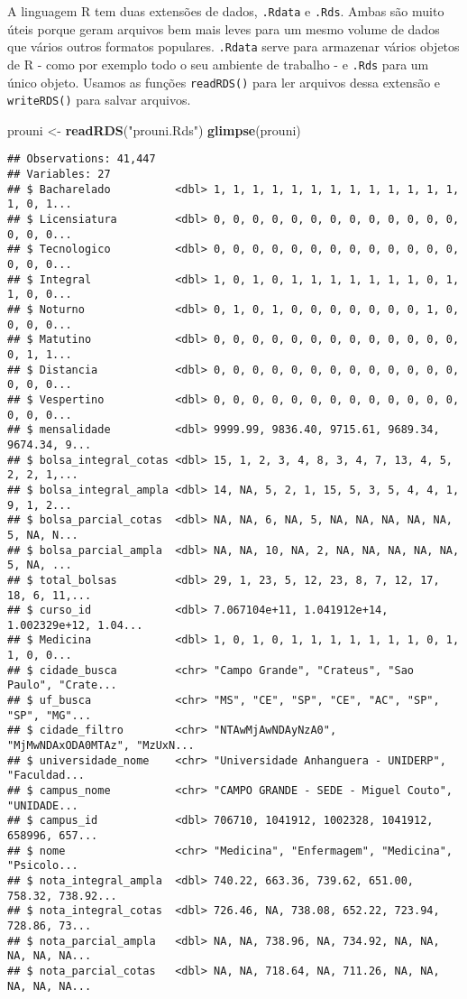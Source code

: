 \documentclass[
]{article}
\newenvironment{Shaded}{\begin{snugshade}}{\end{snugshade}}
\newcommand{\KeywordTok}[1]{\textcolor[rgb]{0.13,0.29,0.53}{\textbf{#1}}}
\newcommand{\NormalTok}[1]{#1}
\newcommand{\StringTok}[1]{\textcolor[rgb]{0.31,0.60,0.02}{#1}}
\begin{document}
A linguagem R tem duas extensões de dados, \texttt{.Rdata} e
\texttt{.Rds}. Ambas são muito úteis porque geram arquivos bem mais
leves para um mesmo volume de dados que vários outros formatos
populares. \texttt{.Rdata} serve para armazenar vários objetos de R -
como por exemplo todo o seu ambiente de trabalho - e \texttt{.Rds} para
um único objeto. Usamos as funções \texttt{readRDS()} para ler arquivos
dessa extensão e \texttt{writeRDS()} para salvar arquivos.

\begin{Shaded}
\begin{Highlighting}[]
\NormalTok{prouni <-}\StringTok{ }\KeywordTok{readRDS}\NormalTok{(}\StringTok{"prouni.Rds"}\NormalTok{)}
\KeywordTok{glimpse}\NormalTok{(prouni)}
\end{Highlighting}
\end{Shaded}

\begin{verbatim}
## Observations: 41,447
## Variables: 27
## $ Bacharelado          <dbl> 1, 1, 1, 1, 1, 1, 1, 1, 1, 1, 1, 1, 1, 1, 0, 1...
## $ Licensiatura         <dbl> 0, 0, 0, 0, 0, 0, 0, 0, 0, 0, 0, 0, 0, 0, 0, 0...
## $ Tecnologico          <dbl> 0, 0, 0, 0, 0, 0, 0, 0, 0, 0, 0, 0, 0, 0, 0, 0...
## $ Integral             <dbl> 1, 0, 1, 0, 1, 1, 1, 1, 1, 1, 1, 0, 1, 1, 0, 0...
## $ Noturno              <dbl> 0, 1, 0, 1, 0, 0, 0, 0, 0, 0, 0, 1, 0, 0, 0, 0...
## $ Matutino             <dbl> 0, 0, 0, 0, 0, 0, 0, 0, 0, 0, 0, 0, 0, 0, 1, 1...
## $ Distancia            <dbl> 0, 0, 0, 0, 0, 0, 0, 0, 0, 0, 0, 0, 0, 0, 0, 0...
## $ Vespertino           <dbl> 0, 0, 0, 0, 0, 0, 0, 0, 0, 0, 0, 0, 0, 0, 0, 0...
## $ mensalidade          <dbl> 9999.99, 9836.40, 9715.61, 9689.34, 9674.34, 9...
## $ bolsa_integral_cotas <dbl> 15, 1, 2, 3, 4, 8, 3, 4, 7, 13, 4, 5, 2, 2, 1,...
## $ bolsa_integral_ampla <dbl> 14, NA, 5, 2, 1, 15, 5, 3, 5, 4, 4, 1, 9, 1, 2...
## $ bolsa_parcial_cotas  <dbl> NA, NA, 6, NA, 5, NA, NA, NA, NA, NA, 5, NA, N...
## $ bolsa_parcial_ampla  <dbl> NA, NA, 10, NA, 2, NA, NA, NA, NA, NA, 5, NA, ...
## $ total_bolsas         <dbl> 29, 1, 23, 5, 12, 23, 8, 7, 12, 17, 18, 6, 11,...
## $ curso_id             <dbl> 7.067104e+11, 1.041912e+14, 1.002329e+12, 1.04...
## $ Medicina             <dbl> 1, 0, 1, 0, 1, 1, 1, 1, 1, 1, 1, 0, 1, 1, 0, 0...
## $ cidade_busca         <chr> "Campo Grande", "Crateus", "Sao Paulo", "Crate...
## $ uf_busca             <chr> "MS", "CE", "SP", "CE", "AC", "SP", "SP", "MG"...
## $ cidade_filtro        <chr> "NTAwMjAwNDAyNzA0", "MjMwNDAxODA0MTAz", "MzUxN...
## $ universidade_nome    <chr> "Universidade Anhanguera - UNIDERP", "Faculdad...
## $ campus_nome          <chr> "CAMPO GRANDE - SEDE - Miguel Couto", "UNIDADE...
## $ campus_id            <dbl> 706710, 1041912, 1002328, 1041912, 658996, 657...
## $ nome                 <chr> "Medicina", "Enfermagem", "Medicina", "Psicolo...
## $ nota_integral_ampla  <dbl> 740.22, 663.36, 739.62, 651.00, 758.32, 738.92...
## $ nota_integral_cotas  <dbl> 726.46, NA, 738.08, 652.22, 723.94, 728.86, 73...
## $ nota_parcial_ampla   <dbl> NA, NA, 738.96, NA, 734.92, NA, NA, NA, NA, NA...
## $ nota_parcial_cotas   <dbl> NA, NA, 718.64, NA, 711.26, NA, NA, NA, NA, NA...
\end{verbatim}
\end{document}
